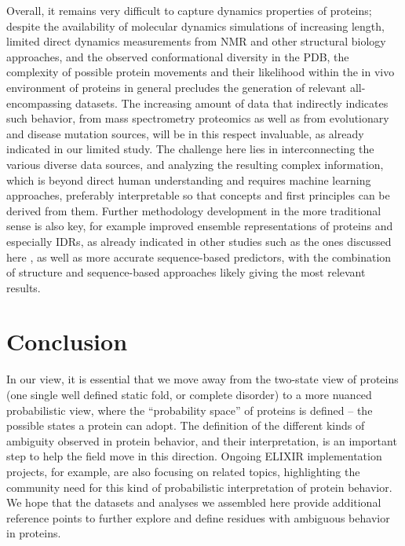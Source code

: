 Overall, it remains very difficult to capture dynamics properties of proteins; despite the availability of molecular dynamics simulations of increasing length, limited direct dynamics measurements from NMR and other structural biology approaches, and the observed conformational diversity in the PDB, the complexity of possible protein movements and their likelihood within the in vivo environment of proteins in general precludes the generation of relevant all-encompassing datasets. The increasing amount of data that indirectly indicates such behavior, from mass spectrometry proteomics \cite{britt_integration_2022} as well as from evolutionary and disease mutation sources, will be in this respect invaluable, as already indicated in our limited study. The challenge here lies in interconnecting the various diverse data sources, and analyzing the resulting complex information, which is beyond direct human understanding and requires machine learning approaches, preferably interpretable so that concepts and first principles can be derived from them. Further methodology development in the more traditional sense is also key, for example improved ensemble representations of proteins and especially IDRs, as already indicated in other studies such as the ones discussed here \cite{alderson_systematic_2022, chakravarty_alphafold2_2022}, as well as more accurate sequence-based predictors, with the combination of structure and sequence-based approaches likely giving the most relevant results.

\section{Conclusion}
In our view, it is essential that we move away from the two-state view of proteins (one single well defined static fold, or complete disorder) to a more nuanced probabilistic view, where the ``probability space'' of proteins is defined – the possible states a protein can adopt. The definition of the different kinds of ambiguity observed in protein behavior, and their interpretation, is an important step to help the field move in this direction. Ongoing ELIXIR implementation projects, for example, are also focusing on related topics, highlighting the community need for this kind of probabilistic interpretation of protein behavior.  We hope that the datasets and analyses we assembled here provide additional reference points to further explore and define residues with ambiguous behavior in proteins.


